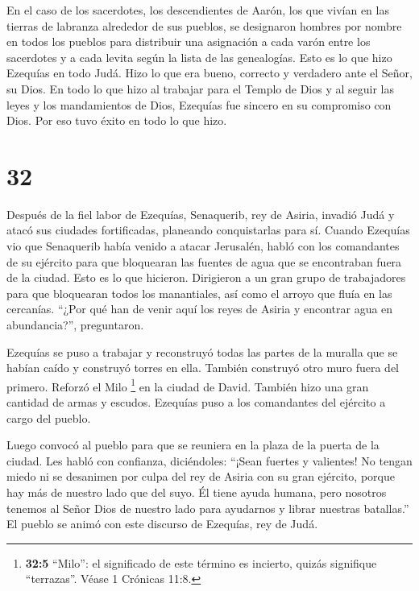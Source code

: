  En el caso de los sacerdotes, los descendientes de Aarón,
los que vivían en las tierras de labranza alrededor de sus pueblos, se
designaron hombres por nombre en todos los pueblos para distribuir una
asignación a cada varón entre los sacerdotes y a cada levita según la
lista de las genealogías.  Esto es lo que hizo Ezequías en
todo Judá. Hizo lo que era bueno, correcto y verdadero ante el Señor, su
Dios.  En todo lo que hizo al trabajar para el Templo de
Dios y al seguir las leyes y los mandamientos de Dios, Ezequías fue
sincero en su compromiso con Dios. Por eso tuvo éxito en todo lo que
hizo.

\hypertarget{section-31}{%
\section{32}\label{section-31}}

 Después de la fiel labor de Ezequías, Senaquerib, rey de
Asiria, invadió Judá y atacó sus ciudades fortificadas, planeando
conquistarlas para sí.  Cuando Ezequías vio que Senaquerib
había venido a atacar Jerusalén,  habló con los comandantes
de su ejército para que bloquearan las fuentes de agua que se
encontraban fuera de la ciudad. Esto es lo que hicieron. 
Dirigieron a un gran grupo de trabajadores para que bloquearan todos los
manantiales, así como el arroyo que fluía en las cercanías. ``¿Por qué
han de venir aquí los reyes de Asiria y encontrar agua en abundancia?'',
preguntaron.

 Ezequías se puso a trabajar y reconstruyó todas las partes
de la muralla que se habían caído y construyó torres en ella. También
construyó otro muro fuera del primero. Reforzó el Milo \footnote{\textbf{32:5}
  ``Milo'': el significado de este término es incierto, quizás
  signifique ``terrazas''. Véase 1 Crónicas 11:8.} en la ciudad de
David. También hizo una gran cantidad de armas y escudos. 
Ezequías puso a los comandantes del ejército a cargo del pueblo.

Luego convocó al pueblo para que se reuniera en la plaza de la puerta de
la ciudad. Les habló con confianza, diciéndoles:  ``¡Sean
fuertes y valientes! No tengan miedo ni se desanimen por culpa del rey
de Asiria con su gran ejército, porque hay más de nuestro lado que del
suyo.  Él tiene ayuda humana, pero nosotros tenemos al Señor
Dios de nuestro lado para ayudarnos y librar nuestras batallas.'' El
pueblo se animó con este discurso de Ezequías, rey de Judá.

